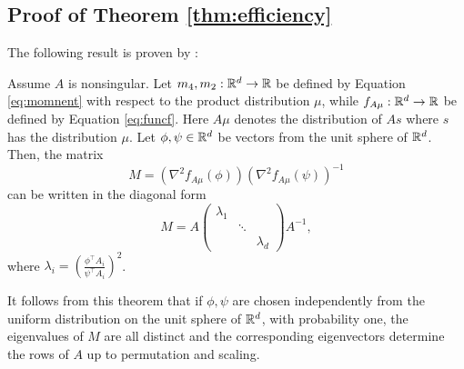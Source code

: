 \subsection{Proof of Theorem \ref{thm:efficiency}}
\label{subsec:ProofEfficiency}
The following result is proven by \citet{hsu2013learning}:
\begin{theorem}
Assume $A$ is nonsingular. 
Let $m_4,m_2:\mathbb{R}^d \rightarrow \mathbb{R}$ be defined by Equation \eqref{eq:momnent} with respect to the product distribution $\mu$,
	while $f_{A\mu}: \mathbb{R}^d \rightarrow \mathbb{R}$ be defined by Equation \eqref{eq:funcf}. Here $A\mu$ denotes the distribution of $As$ where $s$ has the distribution $\mu$.
Let $\phi,\psi\in \mathbb{R}^d$ be vectors from the unit sphere of $\mathbb{R}^d$. Then, 
	the matrix
\begin{equation}
\label{eq:M}
M =(\nabla^2f_{A\mu}(\phi))(\nabla^2f_{A\mu}(\psi))^{-1} 
\end{equation}
can be written in the diagonal form
\begin{equation}
\label{eq:M2}
M = A 
\left(
\begin{array}{ccc}
\lambda_1 & & \\ %
    & \ddots & \\
    & & \lambda_d %
\end{array} 
\right) 
A^{-1},
\end{equation}
where $\lambda_i = \left(\frac{\phi^{\top}A_i}{\psi^{\top}A_i}\right)^2$.
\end{theorem}

It follows from this theorem that 
if $\phi,\psi$ are chosen independently from the uniform distribution on the unit sphere of $\mathbb{R}^d$, with probability one,
the eigenvalues of  $M$ are all distinct and the corresponding eigenvectors
determine the rows of $A$ up to permutation and scaling. 

